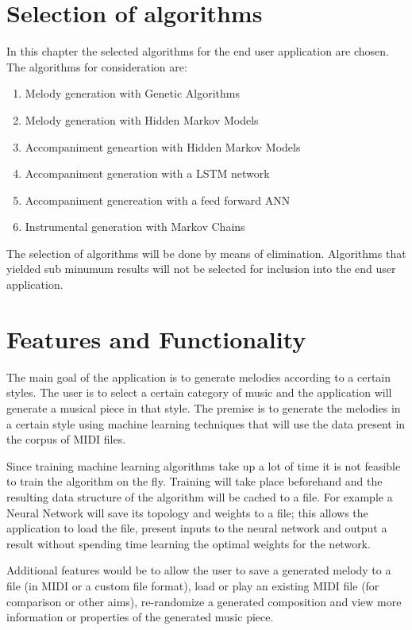 \chapter{Selection of algorithms}
In this chapter the selected algorithms for the end user application are chosen.
The algorithms for consideration are:
\begin{enumerate}
\item Melody generation with Genetic Algorithms
\item Melody generation with Hidden Markov Models
\item Accompaniment geneartion with Hidden Markov Models
\item Accompaniment generation with a \ac{LSTM} network
\item Accompaniment genereation with a feed forward \ac{ANN}
\item Instrumental generation with Markov Chains
\end{enumerate}

The selection of algorithms will be done by means of elimination. Algorithms that yielded sub minumum results will not be selected for inclusion into the end user application.

\chapter{Features and Functionality}
The main goal of the application is to generate melodies according to a certain styles. The user is to select a certain category of music and the application will generate a musical piece in that style. The premise is to generate the melodies in a certain style using machine learning techniques that will use the data present in the corpus of MIDI files. 

Since training machine learning algorithms take up a lot of time it is not feasible to train the algorithm on the fly. Training will take place beforehand and the resulting data structure of the algorithm will be cached to a file. 
For example a Neural Network will save its topology and weights to a file; this allows the application to load the file, present inputs to the neural network and output a result without spending time learning the optimal weights for the network.

Additional features would be to allow the user to save a generated melody to a file (in \ac{MIDI} or a custom file format), load or play an existing \ac{MIDI} file (for comparison or other aims), re-randomize a generated composition and view more information or properties of the generated music piece.

